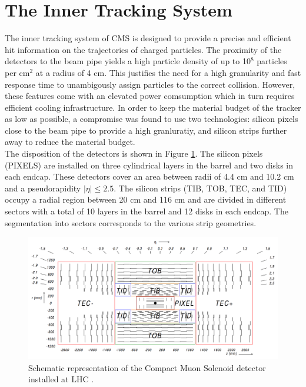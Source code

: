   \section{The Inner Tracking System}

    The inner tracking system of CMS is designed to provide a precise and efficient hit information on the trajectories of charged particles.  The proximity of the detectors to the beam pipe yields a high particle density of up to 10$^8$ particles per cm$^2$ at a radius of 4 cm. This justifies the need for a high granularity and fast response time to unambigously assign particles to the correct collision. However, these features come with an elevated power comsumption which in turn requires efficient cooling infrastructure. In order to keep the material budget of the tracker as low as possible, a compromise was found to use two technologies: silicon pixels close to the beam pipe to provide a high granluratiy, and silicon strips further away to reduce the material budget. \\

    The disposition of the detectors is shown in Figure \ref{fig:I-3-tracker}. The silicon pixels (PIXELS) are installed on three cylindrical layers in the barrel and two disks in each endcap. These detectors cover an area between radii of 4.4 cm and 10.2 cm and a pseudorapidity $ | \eta | \le 2.5 $. The silicon strips (TIB, TOB, TEC, and TID) occupy a radial region between 20 cm and 116 cm and are divided in different sectors with a total of 10 layers in the barrel and 12 disks in each endcap. The segmentation into sectors corresponds to the various strip geometries. \\

    \begin{figure}[h!]
      \centering
      \includegraphics[width=\textwidth]{img/I-3-cms/tracker.png}
      \caption{Schematic representation of the Compact Muon Solenoid detector installed at LHC \cite{1748-0221-3-08-S08004}.}
      \label{fig:I-3-tracker}
    \end{figure}



